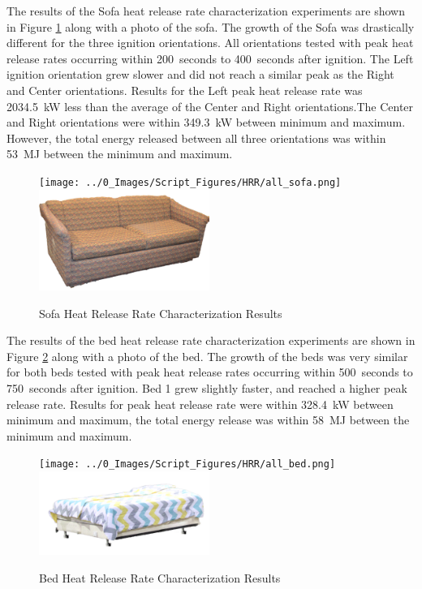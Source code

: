 \documentclass[12pt,oneside]{book}
\begin{document}
The results of the Sofa heat release rate characterization experiments are shown in Figure \ref{fig:sofa_HRR} along with a photo of the sofa. The growth of the Sofa was drastically different for the three ignition orientations. All orientations tested with peak heat release rates occurring within 200~seconds to 400~seconds after ignition. The Left ignition orientation grew slower and did not reach a similar peak as the Right and Center orientations. Results for the Left peak heat release rate was 2034.5~kW less than the average of the Center and Right orientations.The Center and Right orientations were within 349.3~kW between minimum and maximum. However, the total energy released between all three orientations was within 53~MJ between the minimum and maximum. 

\begin{figure}[H]
	\centering
	\texttt{[image: ../0\_Images/Script\_Figures/HRR/all\_sofa.png]}
	\includegraphics[width=0.495\textwidth]{../0_Images/Fuel/Sofa.jpg}
	\caption{Sofa Heat Release Rate Characterization Results}
	\label{fig:sofa_HRR}
\end{figure}

The results of the bed heat release rate characterization experiments are shown in Figure \ref{fig:bed_HRR} along with a photo of the bed. The growth of the beds was very similar for both beds tested with peak heat release rates occurring within 500~seconds to 750~seconds after ignition. Bed 1 grew slightly faster, and reached a higher peak release rate. Results for peak heat release rate were within 328.4~kW between minimum and maximum, the total energy release was within 58~MJ between the minimum and maximum. 

\begin{figure}[H]
	\centering
	\texttt{[image: ../0\_Images/Script\_Figures/HRR/all\_bed.png]}
	\includegraphics[width=0.495\textwidth]{../0_Images/Fuel/Bed.png}
	\caption{Bed Heat Release Rate Characterization Results}
	\label{fig:bed_HRR}
\end{figure}
\end{document}
